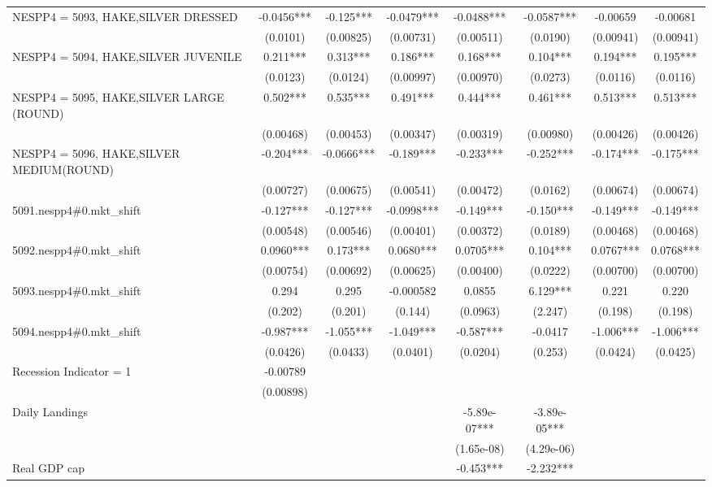 \begin{tabular}{lccccccc}
NESPP4 = 5093, HAKE,SILVER DRESSED & -0.0456*** & -0.125*** & -0.0479*** & -0.0488*** & -0.0587*** & -0.00659 & -0.00681 \\
 & (0.0101) & (0.00825) & (0.00731) & (0.00511) & (0.0190) & (0.00941) & (0.00941) \\
NESPP4 = 5094, HAKE,SILVER JUVENILE & 0.211*** & 0.313*** & 0.186*** & 0.168*** & 0.104*** & 0.194*** & 0.195*** \\
 & (0.0123) & (0.0124) & (0.00997) & (0.00970) & (0.0273) & (0.0116) & (0.0116) \\
NESPP4 = 5095, HAKE,SILVER LARGE (ROUND) & 0.502*** & 0.535*** & 0.491*** & 0.444*** & 0.461*** & 0.513*** & 0.513*** \\
 & (0.00468) & (0.00453) & (0.00347) & (0.00319) & (0.00980) & (0.00426) & (0.00426) \\
NESPP4 = 5096, HAKE,SILVER MEDIUM(ROUND) & -0.204*** & -0.0666*** & -0.189*** & -0.233*** & -0.252*** & -0.174*** & -0.175*** \\
 & (0.00727) & (0.00675) & (0.00541) & (0.00472) & (0.0162) & (0.00674) & (0.00674) \\
5091.nespp4\#0.mkt\_shift & -0.127*** & -0.127*** & -0.0998*** & -0.149*** & -0.150*** & -0.149*** & -0.149*** \\
 & (0.00548) & (0.00546) & (0.00401) & (0.00372) & (0.0189) & (0.00468) & (0.00468) \\
5092.nespp4\#0.mkt\_shift & 0.0960*** & 0.173*** & 0.0680*** & 0.0705*** & 0.104*** & 0.0767*** & 0.0768*** \\
 & (0.00754) & (0.00692) & (0.00625) & (0.00400) & (0.0222) & (0.00700) & (0.00700) \\
5093.nespp4\#0.mkt\_shift & 0.294 & 0.295 & -0.000582 & 0.0855 & 6.129*** & 0.221 & 0.220 \\
 & (0.202) & (0.201) & (0.144) & (0.0963) & (2.247) & (0.198) & (0.198) \\
5094.nespp4\#0.mkt\_shift & -0.987*** & -1.055*** & -1.049*** & -0.587*** & -0.0417 & -1.006*** & -1.006*** \\
 & (0.0426) & (0.0433) & (0.0401) & (0.0204) & (0.253) & (0.0424) & (0.0425) \\
Recession Indicator = 1 & -0.00789 &  &  &  &  &  &  \\
 & (0.00898) &  &  &  &  &  &  \\
Daily Landings &  &  &  & -5.89e-07*** & -3.89e-05*** &  &  \\
 &  &  &  & (1.65e-08) & (4.29e-06) &  &  \\
Real GDP cap &  &  &  & -0.453*** & -2.232*** &  &  \\

\end{tabular}
